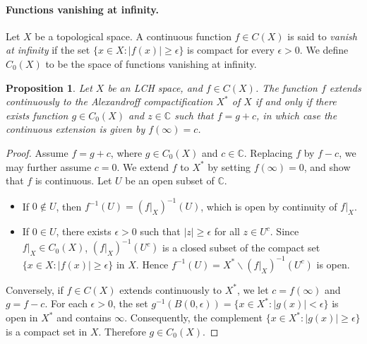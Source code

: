\documentclass{article}
\numberwithin{equation}{section}
\newcommand{\bbC}{\mathbb{C}}
\theoremstyle{plain}
\newtheorem{proposition}[theorem]{Proposition}
\theoremstyle{definition}
\begin{document}
\paragraph{Functions vanishing at infinity.} Let $X$ be a topological space. A continuous function $f\in C(X)$ is said to \textit{vanish at infinity} if the set $\{x\in X:\vert f(x)\vert\geq\epsilon\}$ is compact for every $\epsilon>0$. We define $C_0(X)$ to be the space of functions vanishing at infinity.
\begin{proposition}
	Let $X$ be an LCH space, and $f\in C(X)$. The function $f$ extends continuously to the Alexandroff compactification $X^*$ of $X$ if and only if there exists function $g\in C_0(X)$ and $z\in\bbC$ such that $f=g+c$, in which case the continuous extension is given by $f(\infty)=c$.
\end{proposition}
\begin{proof}
	Assume $f=g+c$, where $g\in C_0(X)$ and $c\in\bbC$. Replacing $f$ by $f-c$, we may further assume $c=0$. We extend $f$ to $X^*$ by setting $f(\infty)=0$, and show that $f$ is continuous. Let $U$ be an open subset of $\bbC$. 
	\begin{itemize}
		\item If $0\notin U$, then $f^{-1}(U)=(f|_X)^{-1}(U)$, which is open by continuity of $f|_X$. 
		\item If $0\in U$, there exists $\epsilon>0$ such that $\vert z\vert\geq\epsilon$ for all $z\in U^c$. Since $f|_X\in C_0(X)$, $(f|_X)^{-1}(U^c)$ is a closed subset of the compact set $\{x\in X:\vert f(x)\vert\geq\epsilon\}$ in $X$. Hence $f^{-1}(U)=X^*\backslash (f|_X)^{-1}(U^c)$ is open.
	\end{itemize}
	
	Conversely, if $f\in C(X)$ extends continuously to $X^*$, we let $c=f(\infty)$ and $g=f-c$. For each $\epsilon>0$, the set $g^{-1}(B(0,\epsilon))=\{x\in X^*:\vert g(x)\vert<\epsilon\}$ is open in $X^*$ and contains $\infty$. Consequently, the complement $\{x\in X^*:\vert g(x)\vert\geq\epsilon\}$ is a compact set in $X$. Therefore $g\in C_0(X)$.
\end{proof}
\end{document}
